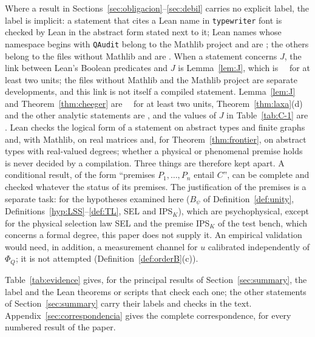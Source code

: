 Where a result in Sections~\ref{sec:obligacion}--\ref{sec:debil} carries no explicit label, the label is implicit: a statement that cites a Lean name in \texttt{typewriter} font is checked by Lean in the abstract form stated next to it; Lean names whose namespace begins with \texttt{QAudit} belong to the Mathlib project and are \stM; the others belong to the files without Mathlib and are \stL. When a statement concerns $J$, the link between Lean's Boolean predicates and $J$ is Lemma~\ref{lem:J}, which is \stA\ \stM\ for at least two units; the files without Mathlib and the Mathlib project are separate developments, and this link is not itself a compiled statement. Lemma~\ref{lem:J} and Theorem~\ref{thm:cheeger} are \stA\ \stM\ for at least two units, Theorem~\ref{thm:laxa}(d) and the other analytic statements are \stA, and the values of $J$ in Table~\ref{tab:C-1} are \stN. Lean checks the logical form of a statement on abstract types and finite graphs and, with Mathlib, on real matrices and, for Theorem~\ref{thm:frontier}, on abstract types with real-valued degrees; whether a physical or phenomenal premise holds is never decided by a compilation. Three things are therefore kept apart. A conditional result, of the form ``premises $P_1,\dots,P_n$ entail $C$'', can be complete and checked whatever the status of its premises. The justification of the premises is a separate task: for the hypotheses examined here ($B_\psi$ of Definition~\ref{def:unity}, Definitions~\ref{hyp:LSS}--\ref{def:TL}, SEL and IPS$_K$), which are psychophysical, except for the physical selection law SEL and the premise IPS$_K$ of the test bench, which concerns a formal degree, this paper does not supply it. An empirical validation would need, in addition, a measurement channel for $u$ calibrated independently of $\Phi_Q$; it is not attempted (Definition~\ref{def:orderB}(c)).

Table~\ref{tab:evidence} gives, for the principal results of Section~\ref{sec:summary}, the label and the Lean theorems or scripts that check each one; the other statements of Section~\ref{sec:summary} carry their labels and checks in the text. Appendix~\ref{sec:correspondencia} gives the complete correspondence, for every numbered result of the paper.

